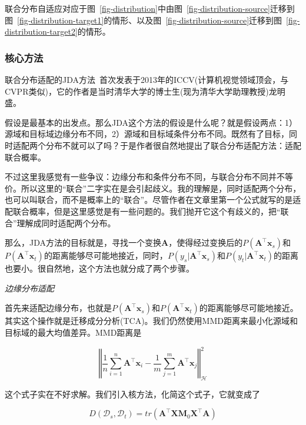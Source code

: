 联合分布自适应对应于图~\ref{fig-distribution}中由图~\ref{fig-distribution-source}迁移到图~\ref{fig-distribution-target1}的情形、以及图~\ref{fig-distribution-source}迁移到图~\ref{fig-distribution-target2}的情形。

\subsubsection{核心方法}

联合分布适配的JDA方法~\cite{long2013transfer}首次发表于2013年的ICCV(计算机视觉领域顶会，与CVPR类似)，它的作者是当时清华大学的博士生(现为清华大学助理教授)龙明盛。

假设是最基本的出发点。那么JDA这个方法的假设是什么呢？就是假设两点：1）源域和目标域边缘分布不同，2）源域和目标域条件分布不同。既然有了目标，同时适配两个分布不就可以了吗？于是作者很自然地提出了联合分布适配方法：适配联合概率。

不过这里我感觉有一些争议：边缘分布和条件分布不同，与联合分布不同并不等价。所以这里的“联合”二字实在是会引起歧义。我的理解是，同时适配两个分布，也可以叫联合，而不是概率上的“联合”。尽管作者在文章里第一个公式就写的是适配联合概率，但是这里感觉是有一些问题的。我们抛开它这个有歧义的，把“联合”理解成同时适配两个分布。

那么，JDA方法的目标就是，寻找一个变换$\mathbf{A}$，使得经过变换后的$P(\mathbf{A}^\top \mathbf{x}_s)$和$P(\mathbf{A}^\top \mathbf{x}_t)$的距离能够尽可能地接近，同时，$P(y_s|\mathbf{A}^\top \mathbf{x}_s)$和$P(y_t|\mathbf{A}^\top \mathbf{x}_t)$的距离也要小。很自然地，这个方法也就分成了两个步骤。

\textit{边缘分布适配}

首先来适配边缘分布，也就是$P(\mathbf{A}^\top \mathbf{x}_s)$和$P(\mathbf{A}^\top \mathbf{x}_t)$的距离能够尽可能地接近。其实这个操作就是迁移成分分析(TCA)。我们仍然使用MMD距离来最小化源域和目标域的最大均值差异。MMD距离是

\begin{equation}
	\left \Vert \frac{1}{n} \sum_{i=1}^{n} \mathbf{A}^\top \mathbf{x}_{i} - \frac{1}{m} \sum_{j=1}^{m} \mathbf{A}^\top \mathbf{x}_{j} \right \Vert ^2_\mathcal{H}
\end{equation}

这个式子实在不好求解。我们引入核方法，化简这个式子，它就变成了

\begin{equation}
	D(\mathcal{D}_s,\mathcal{D}_t)=tr(\mathbf{A}^\top \mathbf{X} \mathbf{M}_0 \mathbf{X}^\top \mathbf{A})
\end{equation}


